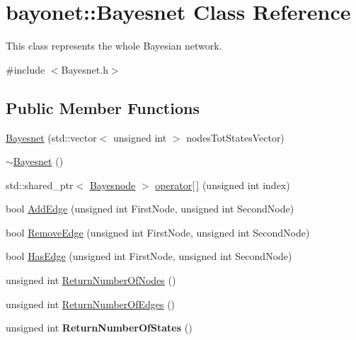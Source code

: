 \hypertarget{classbayonet_1_1_bayesnet}{\section{bayonet\-:\-:Bayesnet Class Reference}
\label{classbayonet_1_1_bayesnet}
}


This class represents the whole Bayesian network.  




{\ttfamily \#include $<$Bayesnet.\-h$>$}

\subsection*{Public Member Functions}
\begin{DoxyCompactItemize}
\item 
\hyperlink{classbayonet_1_1_bayesnet_a27bc4870f26d4bd00953d7589c2d4abd}{Bayesnet} (std\-::vector$<$ unsigned int $>$ nodes\-Tot\-States\-Vector)
\item 
\hyperlink{classbayonet_1_1_bayesnet_af0d3ee29b0676789a3c5d1c33a0e36a2}{$\sim$\-Bayesnet} ()
\item 
std\-::shared\-\_\-ptr$<$ \hyperlink{classbayonet_1_1_bayesnode}{Bayesnode} $>$ \hyperlink{classbayonet_1_1_bayesnet_a805e5513cfef8b16f5f6f38f93aab5db}{operator\mbox{[}$\,$\mbox{]}} (unsigned int index)
\item 
bool \hyperlink{classbayonet_1_1_bayesnet_aba354bf67d39dc73e070e63b9bc45ecd}{Add\-Edge} (unsigned int First\-Node, unsigned int Second\-Node)
\item 
bool \hyperlink{classbayonet_1_1_bayesnet_a0ea810411a987ebeb97b580053ce7c7f}{Remove\-Edge} (unsigned int First\-Node, unsigned int Second\-Node)
\item 
bool \hyperlink{classbayonet_1_1_bayesnet_ae852714069b47eff14918d5a4e53a2dd}{Has\-Edge} (unsigned int First\-Node, unsigned int Second\-Node)
\item 
unsigned int \hyperlink{classbayonet_1_1_bayesnet_a2d68782e4d08abf2bb2f0ad093db78cc}{Return\-Number\-Of\-Nodes} ()
\item 
unsigned int \hyperlink{classbayonet_1_1_bayesnet_a42e6612c84beb2d4e6d5c55792f3ed4e}{Return\-Number\-Of\-Edges} ()
\item 
\hypertarget{classbayonet_1_1_bayesnet_a284d288548d6982ec515ce40106917ca}{unsigned int {\bfseries Return\-Number\-Of\-States} ()}\label{classbayonet_1_1_bayesnet_a284d288548d6982ec515ce40106917ca}


\end{DoxyCompactItemize}

